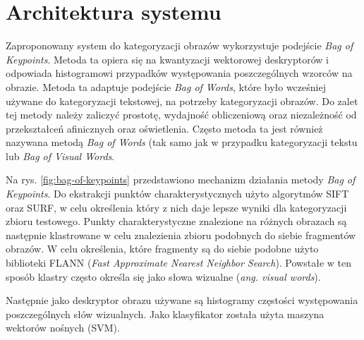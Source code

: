 \section{Architektura systemu}
Zaproponowany system do kategoryzacji obrazów wykorzystuje podejście \emph{Bag of Keypoints}\cite{CSURKA04}. Metoda ta opiera się na kwantyzacji wektorowej deskryptorów i odpowiada histogramowi przypadków występowania poszczególnych wzorców na obrazie. Metoda ta adaptuje podejście \emph{Bag of Words}, które było wcześniej używane do kategoryzacji tekstowej\cite{TONG00}, na potrzeby kategoryzacji obrazów. Do zalet tej metody należy zaliczyć prostotę, wydajność obliczeniową oraz niezależność od przekształceń afinicznych oraz oświetlenia.\cite{CSURKA04} Często metoda ta jest również nazywana metodą \emph{Bag of Words}\cite{TENG11} (tak samo jak w przypadku kategoryzacji tekstu lub \emph{Bag of Visual Words}\cite{KESORN12}.

Na rys. \ref{fig:bag-of-keypoints} przedstawiono mechanizm działania metody \emph{Bag of Keypoints}. Do ekstrakcji punktów charakterystycznych użyto algorytmów SIFT oraz SURF, w celu określenia który z nich daje lepsze wyniki dla kategoryzacji zbioru testowego. Punkty charakterystyczne znalezione na różnych obrazach są następnie klastrowane w celu znalezienia zbioru podobnych do siebie fragmentów obrazów. W celu określenia, które fragmenty są do siebie podobne użyto biblioteki FLANN (\emph{Fast Approximate Nearest Neighbor Search}). Powstałe w ten sposób klastry często określa się jako słowa wizualne (\emph{ang. visual words}).

Następnie jako deskryptor obrazu używane są histogramy częstości występowania poszczególnych słów wizualnych. Jako klasyfikator została użyta maszyna wektorów nośnych (SVM).

